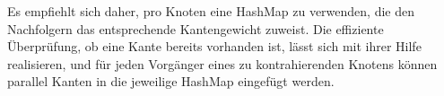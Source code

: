 Es empfiehlt sich daher, pro Knoten eine HashMap zu verwenden, die den Nachfolgern das entsprechende Kantengewicht zuweist.
Die effiziente Überprüfung, ob eine Kante bereits vorhanden ist, lässt sich mit ihrer Hilfe realisieren, und für jeden Vorgänger eines zu kontrahierenden Knotens können parallel Kanten in die jeweilige HashMap eingefügt werden.
